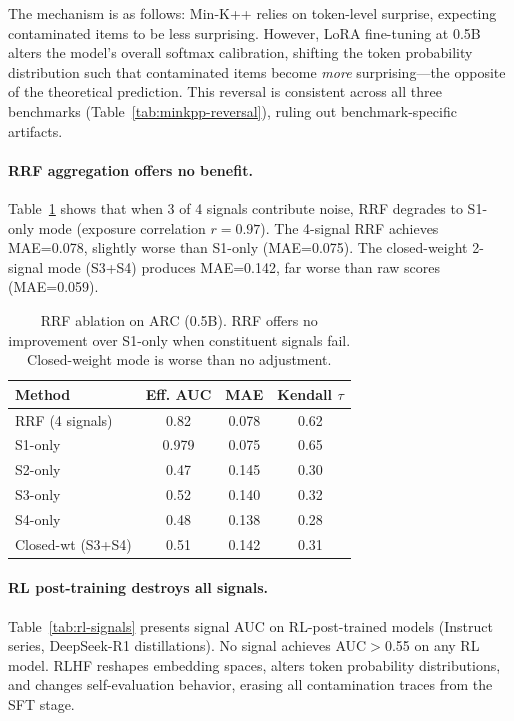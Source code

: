\documentclass[11pt,a4paper]{article}
\begin{document}
The mechanism is as follows: Min-K++ relies on token-level surprise, expecting contaminated items to be less surprising.
However, LoRA fine-tuning at 0.5B alters the model's overall softmax calibration, shifting the token probability distribution such that contaminated items become \emph{more} surprising---the opposite of the theoretical prediction.
This reversal is consistent across all three benchmarks (Table~\ref{tab:minkpp-reversal}), ruling out benchmark-specific artifacts.

\paragraph{RRF aggregation offers no benefit.}
Table~\ref{tab:rrf} shows that when 3 of 4 signals contribute noise, RRF degrades to S1-only mode (exposure correlation $r=0.97$).
The 4-signal RRF achieves MAE=0.078, slightly worse than S1-only (MAE=0.075).
The closed-weight 2-signal mode (S3+S4) produces MAE=0.142, far worse than raw scores (MAE=0.059).

\begin{table}[t]
\centering
\small
\caption{RRF ablation on ARC (0.5B). RRF offers no improvement over S1-only when constituent signals fail. Closed-weight mode is worse than no adjustment.}
\label{tab:rrf}
\begin{tabular}{lccc}
\toprule
\textbf{Method} & \textbf{Eff. AUC} & \textbf{MAE} & \textbf{Kendall $\tau$} \\
\midrule
RRF (4 signals) & 0.82 & 0.078 & 0.62 \\
S1-only & 0.979 & 0.075 & 0.65 \\
S2-only & 0.47 & 0.145 & 0.30 \\
S3-only & 0.52 & 0.140 & 0.32 \\
S4-only & 0.48 & 0.138 & 0.28 \\
Closed-wt (S3+S4) & 0.51 & 0.142 & 0.31 \\
\bottomrule
\end{tabular}
\end{table}

\paragraph{RL post-training destroys all signals.}
Table~\ref{tab:rl-signals} presents signal AUC on RL-post-trained models (Instruct series, DeepSeek-R1 distillations).
No signal achieves AUC$>$0.55 on any RL model.
RLHF reshapes embedding spaces, alters token probability distributions, and changes self-evaluation behavior, erasing all contamination traces from the SFT stage.
\end{document}
